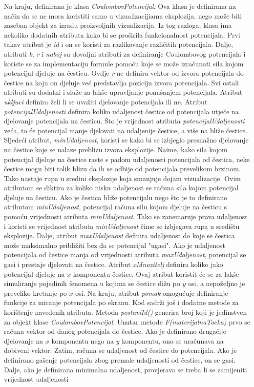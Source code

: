 \documentclass{foi}
\begin{document}
Na kraju, definirana je klasa \textit{CoulombovPotencijal}. Ova klasa je definirana na način da se ne mora koristiti samo u vizualizacijiama eksplozija, nego može biti zaseban objekt za izradu proizvoljnih vizualizacija. Iz tog razloga, klasa ima nekoliko dodatnih atributa kako bi se proširila funkcionalnost potencijala. Prvi takav atribut je \textit{id} i on se koristi za razlikovanje različitih potencijala. Dalje, atributi \textit{k}, \textit{r} i \textit{naboj} su dovoljni atributi za definiranje Coulombovog potencijala i koriste se za implementaciju formule pomoću koje se može izračunati sila kojom potencijal djeluje na česticu. Ovdje \textit{r} ne definira vektor od izvora potencijala do čestice na koju on djeluje već predstavlja poziciju izvora potencijala. Svi ostali atributi su dodatni i služe za lakše upravljanje ponašanjem potencijala. Atribut \textit{ukljuci} definira želi li se uvažiti djelovanje potencijala ili ne. Atribut \textit{potencijalUdaljenosti} definira koliko udaljenost čestice od potencijala utječe na djelovanje potencijala na česticu. Što je vrijednost atributa \textit{potencijalUdaljenosti} veća, to će potencijal manje djelovati na udaljenije čestice, a više na bliže čestice. Sljedeći atribut, \textit{minUdaljenost}, koristi se kako bi se izbjeglo presnažno djelovanje na čestice koje se nalaze preblizu izvora eksplozije. Naime, kako sila kojom potencijal djeluje na čestice raste s padom udaljenosti potencijala od čestica, neke čestice mogu biti tolik blizu da ih se odbije od potencijala prevelikom brzinom. Tako nastaje rupa u sredini eksplozije koja smanjuje dojam vizualizacije. Ovim atributom se diktira za koliko nisku udaljenost se računa sila kojom potencijal djeluje na česticu. Ako je čestica bliže potencijalu nego što je to definirano atributom \textit{minUdaljenost}, potencijal računa silu kojom djeluje na česticu s pomoću vrijednosti atributa \textit{minUdaljenost}. Tako se zanemaruje prava udaljenost i koristi se vrijednost atributa \textit{minUdaljenost} čime se izbjegava rupa u središtu eksplozije. Dalje, atribut \textit{maxUdaljenost} definira udaljenost do koje se čestica može maksimalno približiti bez da se potencijal "ugasi". Ako je udaljenost potencijala od čestice manja od vrijednosti atributa \textit{maxUdaljenost}, potencijal se gasi i prestaje djelovati na čestice. Atribut \textit{xMnozitelj} definira koliko jako potencijal djeluje na $x$ komponentu čestice. Ovaj atribut koristit će se za lakše simuliranje pojedinih fenomena u kojima se čestice dižu po $y$ osi, a nepoželjno je preveliko kretanje po $x$ osi. Na kraju, atribut \textit{pomak} omogućuje definiranje funkcije za micanje potencijala po ekranu. Kod sadrži još i dodatne metode za korištenje navedenih atributa. Metoda \textit{postaviId()} generira broj koji je jedinstven za objekt klase \textit{CoulombovPotencijal}. Unutar metode \textit{F(materijalnaTocka)} prvo se računa vektor od danog potencijala do čestice. Ako je definirano drugačije djelovanje na $x$ komponentu nego na $y$ komponentu, ono se uračunava na dobiveni vektor. Zatim, računa se udaljenost od čestice do potencijala. Ako je definirano gašenje potencijala zbog premale udaljenosti od čestice, on se gasi. Dalje, ako je definirana minimalna udaljenost, provjerava se treba li se zamijeniti vrijednost udaljenosti 
\end{document}
